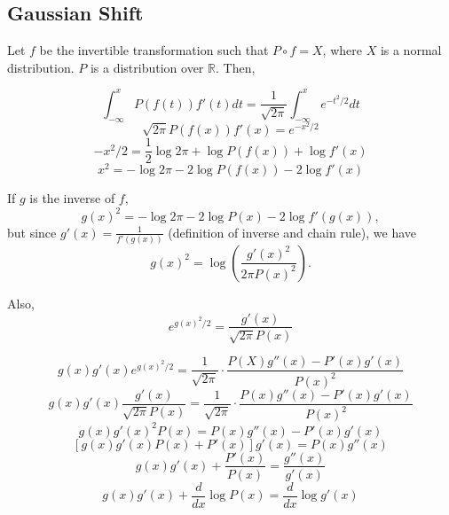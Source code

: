 \documentclass[12pt]{article}
\newcommand{\R}{\mathbb{R}}
\begin{document}
\newpage

\subsection*{Gaussian Shift}

Let $f$ be the invertible transformation such that $P \circ f = X$, where $X$ is a normal distribution. $P$ is a distribution over $\R$.
Then,

$$\int_{-\infty}^x P(f(t))f'(t)dt = \frac{1}{\sqrt{2\pi}}\int_{-\infty}^x e^{-t^2/2}dt$$
$$\sqrt{2\pi} P(f(x))f'(x) = e^{-x^2/2}$$
$$-x^2/2 = \frac{1}{2}\log 2\pi + \log P(f(x)) + \log f'(x)$$
$$x^2 = -\log 2\pi - 2\log P(f(x)) - 2 \log f'(x)$$

If $g$ is the inverse of $f$,
$$g(x)^2 = -\log 2 \pi - 2 \log P(x) - 2 \log f'(g(x)),$$
but since $g'(x) = \frac{1}{f'(g(x))}$ (definition of inverse and chain rule), we have
$$g(x)^2 = \log\left(\frac{g'(x)^2}{2 \pi P(x)^2}\right).$$

Also,
$$e^{g(x)^2/2} = \frac{g'(x)}{\sqrt{2\pi}P(x)}$$

$$g(x)g'(x)e^{g(x)^2/2} = \frac{1}{\sqrt{2\pi}}\cdot\frac{P(X)g''(x) - P'(x)g'(x)}{P(x)^2}$$
$$g(x)g'(x)\frac{g'(x)}{\sqrt{2\pi}P(x)} = \frac{1}{\sqrt{2\pi}}\cdot\frac{P(x)g''(x) - P'(x)g'(x)}{P(x)^2}$$
$$g(x)g'(x)^2 P(x) = P(x)g''(x) - P'(x)g'(x)$$
$$[g(x)g'(x) P(x) + P'(x)]g'(x) = P(x)g''(x)$$
$$g(x)g'(x) + \frac{P'(x)}{P(x)} = \frac{g''(x)}{g'(x)}$$
$$g(x)g'(x) + \frac{d}{dx}\log P(x) = \frac{d}{dx}\log g'(x)$$
\end{document}
